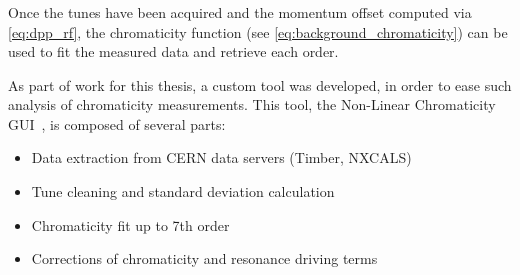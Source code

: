 \subsubsection{}

Once the tunes have been acquired and the momentum offset computed via \cref{eq:dpp_rf}, the
chromaticity function (see \cref{eq:background_chromaticity}) can be used to fit the
measured data and retrieve each order.

As part of work for this thesis, a custom tool was developed, in order to ease such analysis of
chromaticity measurements. This tool, the Non-Linear Chromaticity
GUI~\cite{m_le_garrec_non-linear_2022}, is composed of several parts:

\begin{itemize}
    \tightlist
    \item Data extraction from CERN data servers (Timber, NXCALS)
    \item Tune cleaning and standard deviation calculation
    \item Chromaticity fit up to 7th order
    \item Corrections of chromaticity and resonance driving terms
\end{itemize}

%
%
